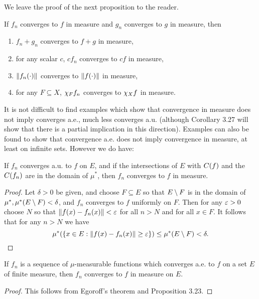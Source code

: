 We leave the proof of the next proposition to the reader.

\begin{proposition}
If $f_n$ converges to $f$ in measure and $g_n$ converges to $g$ in measure, then
\begin{enumerate}[label=\arabic*)]
    \item $f_n+g_n$ converges to $f+g$ in measure,
    \item for any scalar $c$, $cf_n$ converges to $cf$ in measure,
    \item $\norm{f_n(\cdot)}$ converges to $\norm{f(\cdot)}$ in measure,
    \item for any $F\subseteq X$, $\chi_{F}f_n$ converges to $\chi_{X}f$ in measure.
\end{enumerate}
\end{proposition}

It is not difficult to find examples which show that convergence in measure does not imply converges a.e., much less converges a.u. (although Corollary 3.27 will show that there is a partial implication in this direction). Examples can also be found to show that convergence a.e. does not imply convergence in measure, at least on infinite sets. However we do have:

\begin{proposition}
If $f_n$ converges a.u. to $f$ on $E$, and if the intersections of $E$ with $C(f)$ and the $C(f_n)$ are in the domain of $\mu^*$, then $f_n$ converges to $f$ in measure. 
\end{proposition}

\begin{proof}
Let $\delta>0$ be given, and choose $F \subseteq E$ so that $E\setminus F$ is in the domain of $\mu^*, \mu^*(E\setminus F)<\delta$, and $f_n$ converges to $f$ uniformly on $F$. Then for any $\varepsilon>0$ choose $N$ so that $\norm{f(x)-f_n(x)}<\varepsilon$ for all $n>N$ and for all $x \in F$. It follows that for any $n>N$ we have $$\mu^*(\left\{x \in E:\norm{f(x)-f_n(x)} \geq \varepsilon\right\})\leq\mu^*(E\setminus F)<\delta.$$
\end{proof}

\begin{corollary}
If $f_n$ is a sequence of $\mu$-measurable functions which converges a.e. to $f$ on a set $E$ of finite measure, then $f_n$ converges to $f$ in measure on $E$.
\end{corollary}

\begin{proof}
This follows from Egoroff's theorem and Proposition 3.23.
\end{proof}

